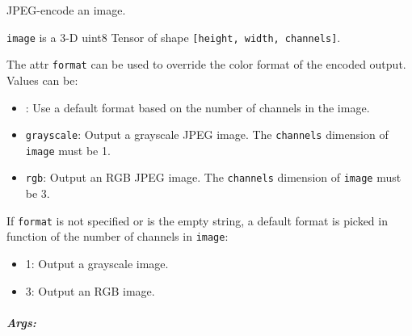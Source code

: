 JPEG-encode an image.

\texttt{image} is a 3-D uint8 Tensor of shape
\texttt{{[}height,\ width,\ channels{]}}.

The attr \texttt{format} can be used to override the color format of the
encoded output. Values can be:

\begin{itemize}
\tightlist
\item
  \texttt{\textquotesingle{}\textquotesingle{}}: Use a default format
  based on the number of channels in the image.
\item
  \texttt{grayscale}: Output a grayscale JPEG image. The
  \texttt{channels} dimension of \texttt{image} must be 1.
\item
  \texttt{rgb}: Output an RGB JPEG image. The \texttt{channels}
  dimension of \texttt{image} must be 3.
\end{itemize}

If \texttt{format} is not specified or is the empty string, a default
format is picked in function of the number of channels in
\texttt{image}:

\begin{itemize}
\tightlist
\item
  1: Output a grayscale image.
\item
  3: Output an RGB image.
\end{itemize}

\subparagraph{Args: }\label{args-1}

